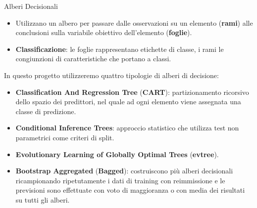 \documentclass[9pt, xcolor=table]{beamer}
\begin{document}
    \begin{frame}{Alberi Decisionali}
    	\begin{itemize}
    		\item Utilizzano un albero per passare dalle osservazioni su un elemento (\textbf{rami}) alle conclusioni sulla variabile obiettivo dell'elemento (\textbf{foglie}).
    		
    		\item \textbf{Classificazione}: le foglie rappresentano etichette di classe, i rami le congiunzioni di caratteristiche che portano a classi.
    	\end{itemize}
    
    	\vfill
    	
    	In questo progetto utilizzeremo quattro tipologie di alberi di decisione:
    	\begin{itemize}
    		\item \textbf{Classification And Regression Tree} (\textbf{CART}): partizionamento ricorsivo dello spazio dei predittori, nel quale ad ogni elemento viene assegnata una
    		classe di predizione.
    		
    		\item \textbf{Conditional Inference Trees}: approccio statistico che utilizza test non parametrici come criteri di split.
    		\item \textbf{Evolutionary Learning of Globally Optimal Trees} (\textbf{evtree}).
    		
    		\item \textbf{Bootstrap Aggregated} (\textbf{Bagged}): costruiscono più alberi decisionali ricampionando ripetutamente i dati di training con reimmissione e le previsioni sono effettuate con voto di maggioranza o con media dei risultati su tutti gli alberi.
    	\end{itemize}
    \end{frame}
\end{document}
